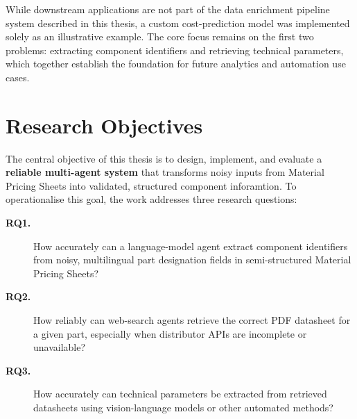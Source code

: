 While downstream applications are not part of the data enrichment pipeline system described in this thesis, a custom cost-prediction model was implemented solely as an illustrative example. The core focus remains on the first two problems: extracting component identifiers and retrieving technical parameters, which together establish the foundation for future analytics and automation use cases.

\section{Research Objectives }
The central objective of this thesis is to design, implement, and evaluate a \textbf{reliable multi-agent system} that transforms noisy inputs from Material Pricing Sheets into validated, structured component inforamtion.  
To operationalise this goal, the work addresses three research questions:

\begin{description}
\item[\textbf{RQ1.}] How accurately can a language-model agent extract component identifiers from noisy, multilingual part designation fields in semi-structured Material Pricing Sheets?

\item[\textbf{RQ2.}] How reliably can web-search agents retrieve the correct PDF datasheet for a given part, especially when distributor APIs are incomplete or unavailable?

\item[\textbf{RQ3.}] How accurately can technical parameters be extracted from retrieved datasheets using vision-language models or other automated methods?
\end{description}

